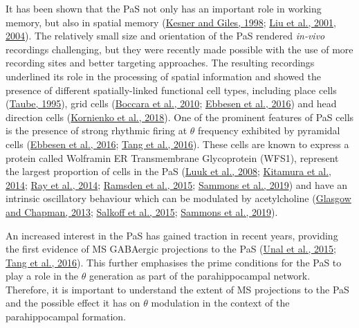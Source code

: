 \documentclass[
  12pt,
  a4paper,
  openany]{book}
\begin{document}
It has been shown that the PaS not only has an important role in working memory, but also in spatial memory (\protect\hyperlink{ref-kesner_neural_1998}{Kesner and Giles, 1998}; \protect\hyperlink{ref-liu_excitotoxic_2001}{Liu et al., 2001}, \protect\hyperlink{ref-liu_excitotoxic_2004}{2004}). The relatively small size and orientation of the PaS rendered \emph{in-vivo} recordings challenging, but they were recently made possible with the use of more recording sites and better targeting approaches. The resulting recordings underlined its role in the processing of spatial information and showed the presence of different spatially-linked functional cell types, including place cells (\protect\hyperlink{ref-taube_place_1995}{Taube, 1995}), grid cells (\protect\hyperlink{ref-boccara_grid_2010}{Boccara et al., 2010}; \protect\hyperlink{ref-ebbesen_cell_2016}{Ebbesen et al., 2016}) and head direction cells (\protect\hyperlink{ref-kornienko_non-rhythmic_2018}{Kornienko et al., 2018}). One of the prominent features of PaS cells is the presence of strong rhythmic firing at \(\theta\) frequency exhibited by pyramidal cells (\protect\hyperlink{ref-ebbesen_cell_2016}{Ebbesen et al., 2016}; \protect\hyperlink{ref-tang_functional_2016}{Tang et al., 2016}). These cells are known to express a protein called Wolframin ER Transmembrane Glycoprotein (WFS1), represent the largest proportion of cells in the PaS (\protect\hyperlink{ref-luuk_distribution_2008}{Luuk et al., 2008}; \protect\hyperlink{ref-kitamura_island_2014}{Kitamura et al., 2014}; \protect\hyperlink{ref-ray_grid-layout_2014}{Ray et al., 2014}; \protect\hyperlink{ref-ramsden_laminar_2015}{Ramsden et al., 2015}; \protect\hyperlink{ref-sammons_electrophysiological_2019}{Sammons et al., 2019}) and have an intrinsic oscillatory behaviour which can be modulated by acetylcholine (\protect\hyperlink{ref-glasgow_muscarinic_2013}{Glasgow and Chapman, 2013}; \protect\hyperlink{ref-salkoff_synaptic_2015}{Salkoff et al., 2015}; \protect\hyperlink{ref-sammons_electrophysiological_2019}{Sammons et al., 2019}).

An increased interest in the PaS has gained traction in recent years, providing the first evidence of MS GABAergic projections to the PaS (\protect\hyperlink{ref-unal_synaptic_2015}{Unal et al., 2015}; \protect\hyperlink{ref-tang_functional_2016}{Tang et al., 2016}). This further emphasises the prime conditions for the PaS to play a role in the \(\theta\) generation as part of the parahippocampal network. Therefore, it is important to understand the extent of MS projections to the PaS and the possible effect it has on \(\theta\) modulation in the context of the parahippocampal formation.
\end{document}
